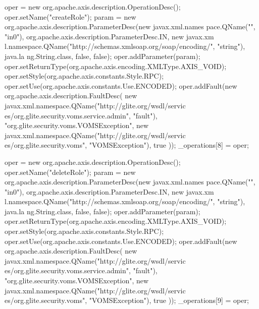 \begin{DoxyCode}
{        oper = new org.apache.axis.description.OperationDesc();
        oper.setName("createRole");
        param = new org.apache.axis.description.ParameterDesc(new javax.xml.names
      pace.QName("", "in0"), org.apache.axis.description.ParameterDesc.IN, new javax.xm
      l.namespace.QName("http://schemas.xmlsoap.org/soap/encoding/", "string"), java.la
      ng.String.class, false, false);
        oper.addParameter(param);
        oper.setReturnType(org.apache.axis.encoding.XMLType.AXIS_VOID);
        oper.setStyle(org.apache.axis.constants.Style.RPC);
        oper.setUse(org.apache.axis.constants.Use.ENCODED);
        oper.addFault(new org.apache.axis.description.FaultDesc(
                      new javax.xml.namespace.QName("http://glite.org/wsdl/servic
      es/org.glite.security.voms.service.admin", "fault"),
                      "org.glite.security.voms.VOMSException",
                      new javax.xml.namespace.QName("http://glite.org/wsdl/servic
      es/org.glite.security.voms", "VOMSException"), 
                      true
                     ));
        _operations[8] = oper;

        oper = new org.apache.axis.description.OperationDesc();
        oper.setName("deleteRole");
        param = new org.apache.axis.description.ParameterDesc(new javax.xml.names
      pace.QName("", "in0"), org.apache.axis.description.ParameterDesc.IN, new javax.xm
      l.namespace.QName("http://schemas.xmlsoap.org/soap/encoding/", "string"), java.la
      ng.String.class, false, false);
        oper.addParameter(param);
        oper.setReturnType(org.apache.axis.encoding.XMLType.AXIS_VOID);
        oper.setStyle(org.apache.axis.constants.Style.RPC);
        oper.setUse(org.apache.axis.constants.Use.ENCODED);
        oper.addFault(new org.apache.axis.description.FaultDesc(
                      new javax.xml.namespace.QName("http://glite.org/wsdl/servic
      es/org.glite.security.voms.service.admin", "fault"),
                      "org.glite.security.voms.VOMSException",
                      new javax.xml.namespace.QName("http://glite.org/wsdl/servic
      es/org.glite.security.voms", "VOMSException"), 
                      true
                     ));
        _operations[9] = oper;

    }
\end{DoxyCode}
